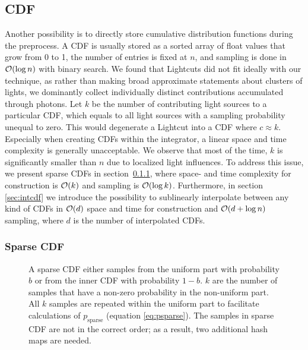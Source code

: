 \subsection{CDF}

Another possibility is to directly store cumulative distribution functions during the preprocess. A CDF is usually stored as a sorted array of float values that grow from 0 to 1, the number of entries is fixed at $n$, and sampling is done in $\mathcal{O}(\log{n})$ with binary search. We found that Lightcuts did not fit ideally with our technique, as rather than making broad approximate statements about clusters of lights, we dominantly collect individually distinct contributions accumulated through photons. Let $k$ be the number of contributing light sources to a particular CDF, which equals to all light sources with a sampling probability unequal to zero. This would degenerate a Lightcut into a CDF where $c \approx k$. Especially when creating CDFs within the integrator, a linear space and time complexity is generally unacceptable. We observe that most of the time, $k$ is significantly smaller than $n$ due to localized light influences. To address this issue, we present sparse CDFs in section~\ref{sec:sparse}, where space- and time complexity for construction is $\mathcal{O}(k)$ and sampling is $\mathcal{O}(\log{k})$. Furthermore, in section \ref{sec:intcdf} we introduce the possibility to sublinearly interpolate between any kind of CDFs in $\mathcal{O}(d)$ space and time for construction and $\mathcal{O}(d + \log{n})$ sampling, where $d$ is the number of interpolated CDFs.

\subsubsection{Sparse CDF}
\label{sec:sparse}
\begin{figure}[htb] 
	\centering
    
    \caption{A sparse CDF either samples from the uniform part with probability $b$ or from the inner CDF with probability $1-b$. $k$ are the number of samples that have a non-zero probability in the non-uniform part. All $k$ samples are repeated within the uniform part to facilitate calculations of $p_{\text{sparse}}$ (equation \ref{eq:psparse}). The samples in sparse CDF are not in the correct order; as a result, two additional hash maps are needed.} 
    \label{fig:sparseCDF}
\end{figure}

